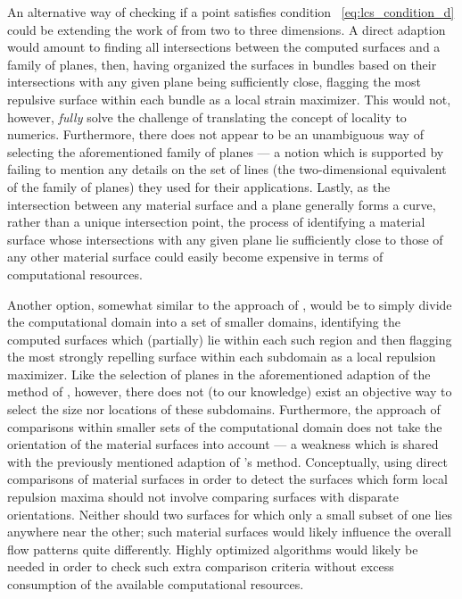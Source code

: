 An alternative way of checking if a point satisfies condition~%
\eqref{eq:lcs_condition_d} could be extending the work of
\textcite{farazmand2012computing} from two to three dimensions. A direct
adaption would amount to finding all intersections between the computed
surfaces and a family of planes, then, having organized the surfaces in bundles
based on their intersections with any given plane being sufficiently close,
flagging the most repulsive surface within each bundle as a local strain
maximizer. This would not, however, \emph{fully} solve the challenge of
translating the concept of locality to numerics. Furthermore, there does not
appear to be an unambiguous way of selecting the aforementioned family of
planes --- a notion which is supported by \textcite{farazmand2012computing}
failing to mention any details on the set of lines (the two-dimensional
equivalent of the family of planes) they used for their applications. Lastly,
as the intersection between any material surface and a plane generally forms a
curve, rather than a unique intersection point, the process of identifying a
material surface whose intersections with any given plane lie sufficiently
close to those of any other material surface could easily become expensive in
terms of computational resources.

Another option, somewhat similar to the approach of
\textcite{farazmand2012computing}, would be to simply divide the computational
domain into a set of smaller domains, identifying the computed surfaces which
(partially) lie within each such region and then flagging the most strongly
repelling surface within each subdomain as a local repulsion maximizer. Like
the selection of planes in the aforementioned adaption of the method of
\citeauthor{farazmand2012computing}, however, there does not (to our knowledge)
exist an objective way to select the size nor locations of these subdomains.
Furthermore, the approach of comparisons within smaller sets of the
computational domain does not take the orientation of the material surfaces
into account --- a weakness which is shared with the previously mentioned
adaption of \citeauthor{farazmand2012computing}'s method. Conceptually, using
direct comparisons of material surfaces in order to detect the surfaces which
form local repulsion maxima should not involve comparing surfaces with
disparate orientations. Neither should two surfaces for which only a small
subset of one lies anywhere near the other; such material surfaces would likely
influence the overall flow patterns quite differently. Highly optimized
algorithms would likely be needed in order to check such extra comparison
criteria without excess consumption of the available computational resources.

